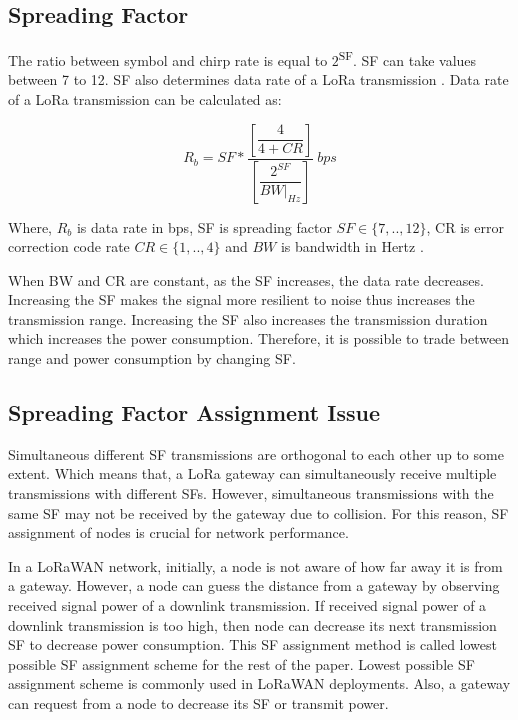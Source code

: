 \documentclass[conference]{IEEEtran}
\begin{document}
\subsection{Spreading Factor}
The ratio between symbol and chirp rate is equal to $2$\textsuperscript{SF}. SF can take values between 7 to 12. SF also determines data rate of a LoRa transmission \cite{AN1200.22}. Data rate of a LoRa transmission can be calculated as:

\begin{equation} \label{eq:bit_rate_sf}
R_{b} = SF * \dfrac{\left[ \dfrac{4}{4+CR} \right] }{ \left[ \dfrac{2^{SF}}{BW|_{Hz}} \right]} \ bps
\end{equation}

Where, $R_{b}$ is data rate in bps, SF is spreading factor $SF \in \{7,..,12\}$, CR is error correction code rate $CR \in \{1,..,4\}$ and $BW$ is bandwidth in Hertz \cite{AN1200.22}.

When BW and CR are constant, as the SF increases, the data rate decreases. Increasing the SF makes the signal more resilient to noise thus increases the transmission range. Increasing the SF also increases the transmission duration which increases the power consumption. Therefore, it is possible to trade between range and power consumption by changing SF.

\subsection{Spreading Factor Assignment Issue}
Simultaneous different SF transmissions are orthogonal to each other up to some extent. Which means that, a LoRa gateway can simultaneously receive multiple transmissions with different SFs. However, simultaneous transmissions with the same SF may not be received by the gateway due to collision. For this reason, SF assignment of nodes is crucial for network performance.

In a LoRaWAN network, initially, a node is not aware of how far away it is from a gateway. However, a node can guess the distance from a gateway by observing received signal power of a downlink transmission. If received signal power of a downlink transmission is too high, then node can decrease its next transmission SF to decrease power consumption. This SF assignment method is called lowest possible SF assignment scheme for the rest of the paper. Lowest possible SF assignment scheme is commonly used in LoRaWAN deployments. Also, a gateway can request from a node to decrease its SF or transmit power.
\end{document}
